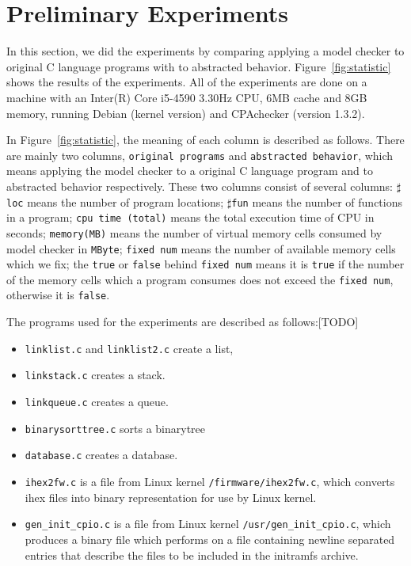 \section{Preliminary Experiments}
\label{sec:experiment}
In this section, we did the experiments by comparing applying a model
checker to original C language programs with to abstracted
behavior. Figure~\ref{fig:statistic} shows the results of the
experiments. All of the experiments are done on a machine with an
Inter(R) Core i5-4590 3.30Hz CPU, 6MB cache and 8GB memory, running
Debian (kernel version) and CPAchecker (version 1.3.2).

In Figure~\ref{fig:statistic}, the meaning of each column is described
as follows. There are mainly two columns, \texttt{original programs}
and \texttt{abstracted behavior}, which means applying the model
checker to a original C language program and to abstracted behavior
respectively. These two columns consist of several columns:
$\sharp$\texttt{loc} means the number of program locations;
$\sharp$\texttt{fun} means the number of functions in a program;
\texttt{cpu time (total)} means the total execution time of CPU in
seconds; \texttt{memory(MB)} means the number of virtual memory cells
consumed by model checker in \texttt{MByte}; \texttt{fixed num} means
the number of available memory cells which we fix; the \texttt{true}
or \texttt{false} behind \texttt{fixed num} means it is \texttt{true}
if the number of the memory cells which a program consumes does not
exceed the \texttt{fixed num}, otherwise it is \texttt{false}.

The programs used for the experiments are described as follows:[TODO]
\begin{itemize}
\item \texttt{linklist.c} and \texttt{linklist2.c} create a list,
\item \texttt{linkstack.c} creates a stack.
\item \texttt{linkqueue.c} creates a queue.
\item \texttt{binarysorttree.c} sorts a binarytree
\item \texttt{database.c} creates a database.
\item \texttt{ihex2fw.c} is a file from Linux kernel
  \texttt{/firmware/ihex2fw.c}, which converts ihex files into binary
  representation for use by Linux kernel.
\item \texttt{gen\_init\_cpio.c} is a file from Linux kernel
  \texttt{/usr/gen\_init\_cpio.c}, which produces a binary file which
  performs on a file containing newline separated entries that
  describe the files to be included in the initramfs archive.
\end{itemize}

